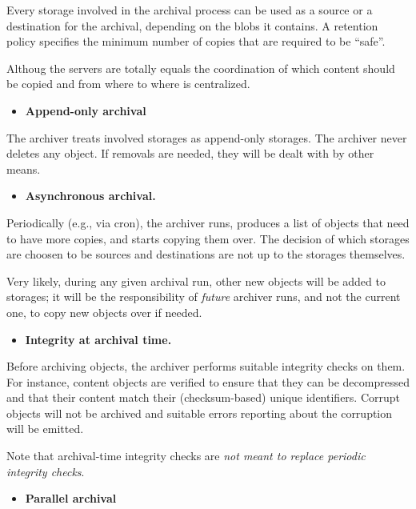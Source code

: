 Every storage involved in the archival process can be used as a source
or a destination for the archival, depending on the blobs it contains. A
retention policy specifies the minimum number of copies that are
required to be ``safe''.

Althoug the servers are totally equals the coordination of which content
should be copied and from where to where is centralized.

\begin{itemize}
\itemsep1pt\parskip0pt
\item
  \textbf{Append-only archival}
\end{itemize}

The archiver treats involved storages as append-only storages. The
archiver never deletes any object. If removals are needed, they will be
dealt with by other means.

\begin{itemize}
\itemsep1pt\parskip0pt
\item
  \textbf{Asynchronous archival.}
\end{itemize}

Periodically (e.g., via cron), the archiver runs, produces a list of
objects that need to have more copies, and starts copying them over. The
decision of which storages are choosen to be sources and destinations
are not up to the storages themselves.

Very likely, during any given archival run, other new objects will be
added to storages; it will be the responsibility of \emph{future}
archiver runs, and not the current one, to copy new objects over if
needed.

\begin{itemize}
\itemsep1pt\parskip0pt
\item
  \textbf{Integrity at archival time.}
\end{itemize}

Before archiving objects, the archiver performs suitable integrity
checks on them. For instance, content objects are verified to ensure
that they can be decompressed and that their content match their
(checksum-based) unique identifiers. Corrupt objects will not be
archived and suitable errors reporting about the corruption will be
emitted.

Note that archival-time integrity checks are \emph{not meant to replace
periodic integrity checks}.

\begin{itemize}
\itemsep1pt\parskip0pt
\item
  \textbf{Parallel archival}
\end{itemize}

